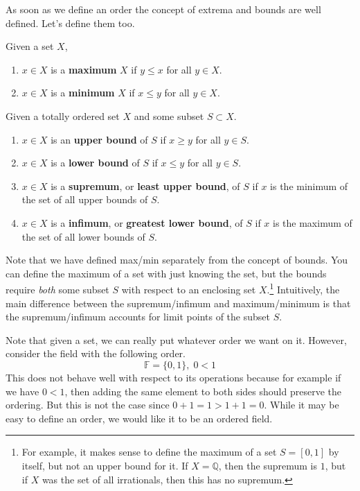 \documentclass{article}
\begin{document}
      As soon as we define an order the concept of extrema and bounds are well defined. Let's define them too. 

      \begin{definition}
        Given a set $X$, 
        \begin{enumerate}
          \item $x \in X$ is a \textbf{maximum} $X$ if $y \leq x$ for all $y \in X$. 
          \item $x \in X$ is a \textbf{minimum} $X$ if $x \leq y$ for all $y \in X$. 
        \end{enumerate}
        Given a totally ordered set $X$ and some subset $S \subset X$. 
        \begin{enumerate}
          \item $x \in X$ is an \textbf{upper bound} of $S$ if $x \geq y$ for all $y \in S$. 
          \item $x \in X$ is a \textbf{lower bound} of $S$ if $x \leq y$ for all $y \in S$. 
          \item $x \in X$ is a \textbf{supremum}, or \textbf{least upper bound}, of $S$ if $x$ is the minimum of the set of all upper bounds of $S$. 
          \item $x \in X$ is a \textbf{infimum}, or \textbf{greatest lower bound}, of $S$ if $x$ is the maximum of the set of all lower bounds of $S$. 
        \end{enumerate}
        Note that we have defined max/min separately from the concept of bounds. You can define the maximum of a set with just knowing the set, but the bounds require \textit{both} some subset $S$ with respect to an enclosing set $X$.\footnote{For example, it makes sense to define the maximum of a set $S = [0, 1]$ by itself, but not an upper bound for it. If $X = \mathbb{Q}$, then the supremum is $1$, but if $X$ was the set of all irrationals, then this has no supremum.} Intuitively, the main difference between the supremum/infimum and maximum/minimum is that the supremum/infimum accounts for limit points of the subset $S$. 
      \end{definition}

      Note that given a set, we can really put whatever order we want on it. However, consider the field with the following order. 
      \begin{equation}
        \mathbb{F} = \{0, 1\}, \; 0 < 1
      \end{equation} 
      This does not behave well with respect to its operations because for example if we have $0 < 1$, then adding the same element to both sides should preserve the ordering. But this is not the case since $0 + 1 = 1 > 1 + 1 = 0$. While it may be easy to define an order, we would like it to be an ordered field. 
\end{document}
